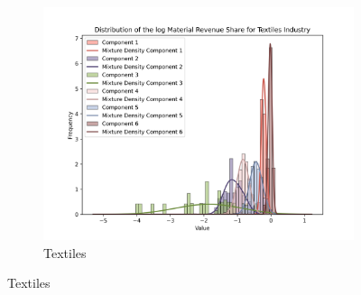 \documentclass{article}
\begin{document}
\begin{figure}[ht!]
\begin{subfigure}[t]{0.32\textwidth}
        \centering
        \includegraphics[width=\textwidth]{figure/empirical_error_kmshare_ciiu_Textiles.png}
        \caption{Textiles}
    \end{subfigure}
\end{figure}
\end{document}
